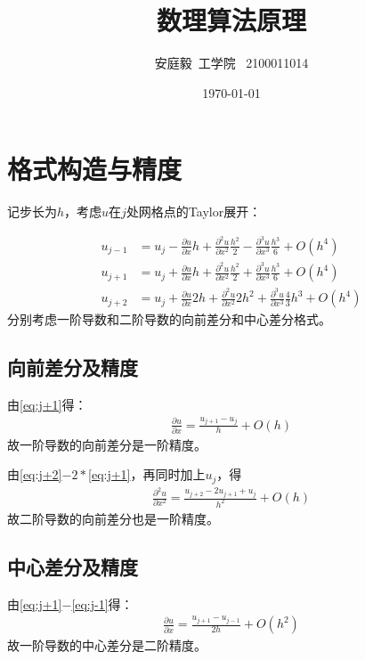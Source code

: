 \documentclass[12pt, a4paper]{article}
\title{数理算法原理}
\author{安庭毅\ 工学院 \ 2100011014}
\date{\today} %
\begin{document}
\maketitle %

\section{格式构造与精度}

记步长为$h$，考虑$u$在$j$处网格点的Taylor展开：

\begin{align}
    u_{j-1} &= u_{j} - \frac{\partial{u}}{\partial{x}}h + \frac{\partial^2{u}}{\partial{x}^2}\frac{h^2}{2} - \frac{\partial^3{u}}{\partial{x}^3}\frac{h^3}{6} + O(h^4) \label{eq:j-1}\\
    u_{j+1} &= u_{j} + \frac{\partial{u}}{\partial{x}}h + \frac{\partial^2{u}}{\partial{x}^2}\frac{h^2}{2} + \frac{\partial^3{u}}{\partial{x}^3}\frac{h^3}{6} + O(h^4) \label{eq:j+1}\\
    u_{j+2} &= u_{j} + \frac{\partial{u}}{\partial{x}}2h + \frac{\partial^2{u}}{\partial{x}^2}2h^2 + \frac{\partial^3{u}}{\partial{x}^3}\frac{4}{3}h^3 + O(h^4) \label{eq:j+2}
\end{align}
分别考虑一阶导数和二阶导数的向前差分和中心差分格式。

\subsection{向前差分及精度}
由\eqref{eq:j+1}得：
\begin{align}
    \frac{\partial{u}}{\partial{x}} = \frac{u_{j+1} - u_{j}}{h} + O(h)
\end{align}
故一阶导数的向前差分是一阶精度。

由\eqref{eq:j+2}$ - 2 * $\eqref{eq:j+1}，再同时加上$u_{j}$，得
\begin{align}
    \frac{\partial^2{u}}{\partial{x}^2} = \frac{u_{j+2} - 2u_{j+1} + u_{j}}{h^2} + O(h)
\end{align}
故二阶导数的向前差分也是一阶精度。

\subsection{中心差分及精度}
由\eqref{eq:j+1}$-$\eqref{eq:j-1}得：
\begin{align}
    \frac{\partial{u}}{\partial{x}} = \frac{u_{j+1}-u_{j-1}}{2h} + O(h^2)
\end{align}
故一阶导数的中心差分是二阶精度。
\end{document}
